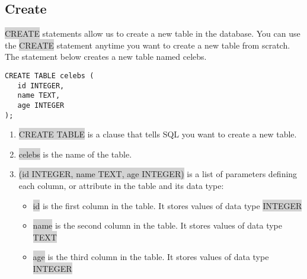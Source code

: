 \documentclass[11pt]{article}
\begin{document}
\subsection{Create}
\colorbox{lightgray}{CREATE} statements allow us to create a new table in the database. You can use the \colorbox{lightgray}{CREATE} statement anytime you want to create a new table from scratch. The statement below creates a new table named celebs.
\begin{lstlisting}
CREATE TABLE celebs (
   id INTEGER, 
   name TEXT, 
   age INTEGER
);
\end{lstlisting}
\begin{enumerate}[leftmargin = *]
\item \colorbox{lightgray}{CREATE TABLE} is a clause that tells SQL you want to create a new table.
\item \colorbox{lightgray}{celebs} is the name of the table.
\item \colorbox{lightgray}{(id INTEGER, name TEXT, age INTEGER)} is a list of parameters defining each column, or attribute in the table and its data type:
\begin{itemize}
\item \colorbox{lightgray}{id} is the first column in the table. It stores values of data type \colorbox{lightgray}{INTEGER}
\item \colorbox{lightgray}{name} is the second column in the table. It stores values of data type \colorbox{lightgray}{TEXT}
\item \colorbox{lightgray}{age} is the third column in the table. It stores values of data type \colorbox{lightgray}{INTEGER}
\end{itemize}
\end{enumerate}
\end{document}
